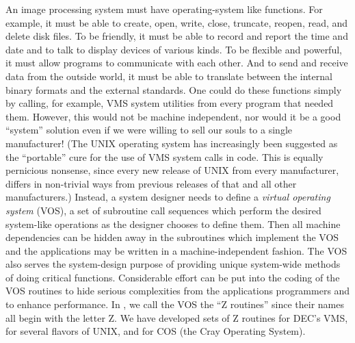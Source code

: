 
     An image processing system must have  operating-system like
functions.  For example, it must be able to create, open, write,
close, truncate, reopen, read, and delete disk files.  To be
friendly, it must be able to record and report the time and date
and to talk to display devices of various kinds.  To be flexible
and powerful, it must allow programs to communicate with each other.
And to send and receive data from the outside world, it must be able
to translate between the internal binary formats and the external
standards.  One could do these functions simply by calling, for
example, VMS system utilities from every program that needed them.
However, this would not be machine independent, nor would it be
a good ``system'' solution even if we were willing to sell our souls
to a single manufacturer!  (The UNIX operating system has increasingly been
suggested as the ``portable'' cure for the use of VMS system calls
in code.  This is equally pernicious nonsense, since every new release
of UNIX from every manufacturer, differs in non-trivial ways from
previous releases of that and all other manufacturers.)   Instead,
a system designer needs to define a {\it virtual operating system}
(VOS), a set of subroutine call sequences which perform the
desired system-like operations as the designer chooses to define
them.  Then all machine dependencies can be hidden away in the
subroutines which implement the VOS and the applications may be
written in a machine-independent fashion.  The VOS also serves
the system-design purpose of providing unique system-wide methods
of doing critical functions.  Considerable effort can be put
into the coding of the VOS routines to hide serious complexities
from the applications programmers and to enhance performance.
In \AIPS, we call the VOS the ``Z routines'' since their names
all begin with the letter \hbox{Z}.  We have developed sets of
Z routines for DEC's VMS, for several flavors of UNIX, and
for COS (the Cray Operating System).

